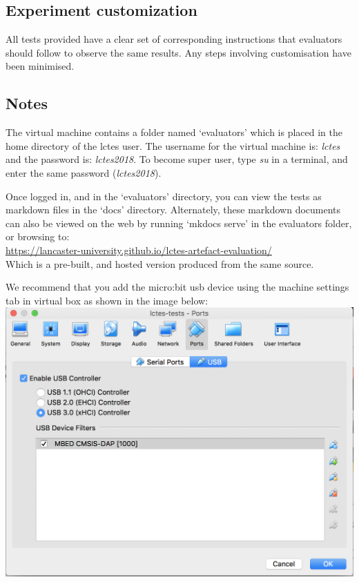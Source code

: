 {%
\subsection{Experiment customization}

All tests provided have a clear set of corresponding instructions that evaluators should follow to observe the same results. Any steps involving customisation have been minimised.

\subsection{Notes}

The virtual machine contains a folder named `evaluators' which is placed in the home directory of the lctes user. The username for the virtual machine is: \textit{lctes} and the password is: \textit{lctes2018}. To become super user, type \textit{su} in a terminal, and enter the same password (\textit{lctes2018}).

Once logged in, and in the `evaluators' directory, you can view the tests as markdown files in the `docs' directory. Alternately, these markdown documents can also be viewed on the web by running `mkdocs serve' in the evaluators folder, or browsing to:\\[5pt]\url{https://lancaster-university.github.io/lctes-artefact-evaluation/}\\[5pt] Which is a pre-built, and hosted version produced from the same source.

We recommend that you add the micro:bit usb device using the machine settings tab in virtual box as shown in the image below:\\

\includegraphics[width=\columnwidth]{images/virtualbox.png}

}
